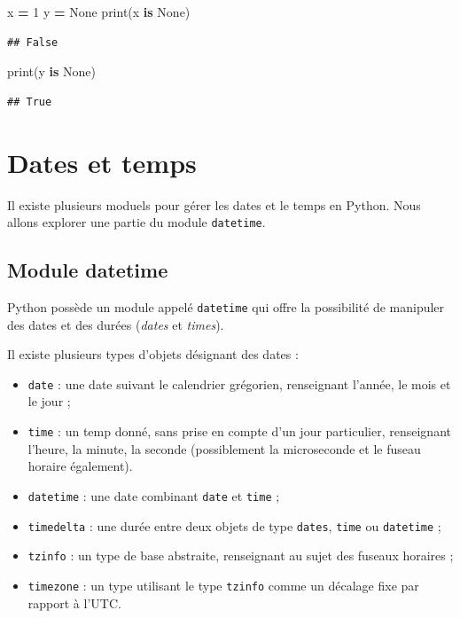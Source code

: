 \documentclass[12pt,]{book}
\newenvironment{Shaded}{\begin{snugshade}}{\end{snugshade}}
\newcommand{\KeywordTok}[1]{\textcolor[rgb]{0.13,0.29,0.53}{\textbf{#1}}}
\newcommand{\DecValTok}[1]{\textcolor[rgb]{0.00,0.00,0.81}{#1}}
\newcommand{\VariableTok}[1]{\textcolor[rgb]{0.00,0.00,0.00}{#1}}
\newcommand{\OperatorTok}[1]{\textcolor[rgb]{0.81,0.36,0.00}{\textbf{#1}}}
\newcommand{\BuiltInTok}[1]{#1}
\newcommand{\NormalTok}[1]{#1}
\providecommand{\tightlist}{%
  \setlength{\itemsep}{0pt}\setlength{\parskip}{0pt}}
\numberwithin{equation}{section}
\numberwithin{countremarque}{section}
\begin{document}
\begin{Shaded}
\begin{Highlighting}[]
\NormalTok{x }\OperatorTok{=} \DecValTok{1}
\NormalTok{y }\OperatorTok{=} \VariableTok{None}
\BuiltInTok{print}\NormalTok{(x }\KeywordTok{is} \VariableTok{None}\NormalTok{)}
\end{Highlighting}
\end{Shaded}

\begin{lstlisting}
## False
\end{lstlisting}

\begin{Shaded}
\begin{Highlighting}[]
\BuiltInTok{print}\NormalTok{(y }\KeywordTok{is} \VariableTok{None}\NormalTok{)}
\end{Highlighting}
\end{Shaded}

\begin{lstlisting}
## True
\end{lstlisting}

\section{Dates et temps}\label{dates-et-temps}

Il existe plusieurs moduels pour gérer les dates et le temps en Python.
Nous allons explorer une partie du module \texttt{datetime}.

\subsection{Module datetime}\label{module-datetime}

Python possède un module appelé \texttt{datetime} qui offre la
possibilité de manipuler des dates et des durées (\emph{dates} et
\emph{times}).

Il existe plusieurs types d'objets désignant des dates :

\begin{itemize}
\tightlist
\item
  \texttt{date} : une date suivant le calendrier grégorien, renseignant
  l'année, le mois et le jour ;
\item
  \texttt{time} : un temp donné, sans prise en compte d'un jour
  particulier, renseignant l'heure, la minute, la seconde (possiblement
  la microseconde et le fuseau horaire également).
\item
  \texttt{datetime} : une date combinant \texttt{date} et \texttt{time}
  ;
\item
  \texttt{timedelta} : une durée entre deux objets de type
  \texttt{dates}, \texttt{time} ou \texttt{datetime} ;
\item
  \texttt{tzinfo} : un type de base abstraite, renseignant au sujet des
  fuseaux horaires ;
\item
  \texttt{timezone} : un type utilisant le type \texttt{tzinfo} comme un
  décalage fixe par rapport à l'UTC.
\end{itemize}
\end{document}

